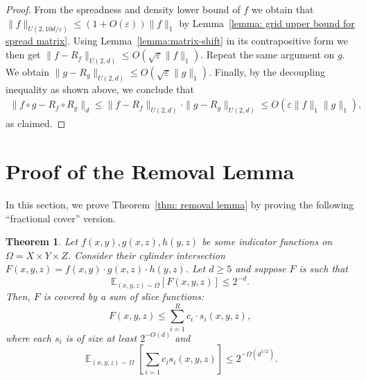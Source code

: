 \documentclass[11pt]{article}
\newtheorem{theorem}{Theorem}[section]
\DeclareMathOperator*{\E}{\mathbb{E}}
\newcommand{\1}{ \mathbbm{1}}
\newcommand{\eps}{\varepsilon}
\begin{document}
\begin{proof}
    From the spreadness and density lower bound of $f$ we obtain that $\|f\|_{U(2,10d/\eps)}\le (1+O(\eps))\|f\|_1$ by Lemma~\ref{lemma: grid upper bound for spread matrix}. Using Lemma~\ref{lemma:matrix-shift} in its contrapositive form we then get $\|f-R_f\|_{U(2,d)}\le O(\sqrt{\eps} \|f\|_1)$. Repeat the same argument on $g$. We obtain $\|g-R_g\|_{U(2,d)}\le O(\sqrt{\eps} \|g\|_1)$. Finally, by the decoupling inequality as shown above, we conclude that
    \begin{align*}
        \|f\circ g - R_f\circ R_g\|_d \le \|f-R_f\|_{U(2,d)} \cdot \|g - R_g\|_{U(2,d)} \le O(\eps \|f\|_1\|g\|_1),
    \end{align*}
    as claimed.
\end{proof}

\section{Proof of the Removal Lemma}

In this section, we prove Theorem~\ref{thm: removal lemma} by proving the following ``fractional cover'' version.

\begin{theorem} \label{thm: fractional cover}
    Let $f(x,y), g(x,z), h(y,z)$ be some indicator functions on $\Omega = X\times Y\times Z$. Consider their cylinder intersection $F(x,y,z) = f(x,y)\cdot g(x,z)\cdot h(y,z)$. Let $d \ge 5$ and suppose $F$ is such that
    $$
    \mathbb{E}_{(x,y,z)\sim \Omega}[F(x,y,z)] \le 2^{-d}.
    $$
    Then, $F$ is covered by a sum of slice functions:
    $$
    F(x,y,z) \le \sum_{i=1}^{R} c_i\cdot  s_i(x,y,z),
    $$
    where each $s_i$ is of size at least $2^{-O(d)}$ and
    $$
    \E_{(x,y,z)\sim \Omega}\left[\sum_{i=1} c_i s_i(x,y,z) \right] \le 2^{-\Omega(d^{1/2})}.
    $$
\end{theorem}

\end{document}
